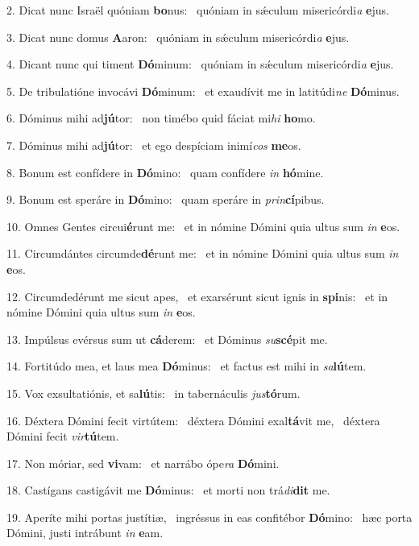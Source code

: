 2. Dicat nunc Israël quóniam \textbf{bo}nus: \ast\  quóniam in sǽculum misericórdi\textit{a} \textbf{e}jus.\

3. Dicat nunc domus \textbf{A}aron: \ast\  quóniam in sǽculum misericórdi\textit{a} \textbf{e}jus.\

4. Dicant nunc qui timent \textbf{Dó}minum: \ast\  quóniam in sǽculum misericórdi\textit{a} \textbf{e}jus.\

5. De tribulatióne invocávi \textbf{Dó}minum: \ast\  et exaudívit me in latitúdi\textit{ne} \textbf{Dó}minus.\

6. Dóminus mihi ad\textbf{jú}tor: \ast\  non timébo quid fáciat mi\textit{hi} \textbf{ho}mo.\

7. Dóminus mihi ad\textbf{jú}tor: \ast\  et ego despíciam inimí\textit{cos} \textbf{me}os.\

8. Bonum est confídere in \textbf{Dó}mino: \ast\  quam confídere \textit{in} \textbf{hó}mine.\

9. Bonum est speráre in \textbf{Dó}mino: \ast\  quam speráre in \textit{prin}\textbf{cí}pibus.\

10. Omnes Gentes circui\textbf{é}runt me: \ast\  et in nómine Dómini quia ultus sum \textit{in} \textbf{e}os.\

11. Circumdántes circumde\textbf{dé}runt me: \ast\  et in nómine Dómini quia ultus sum \textit{in} \textbf{e}os.\

12. Circumdedérunt me sicut apes, \dag\  et exarsérunt sicut ignis in \textbf{spi}nis: \ast\  et in nómine Dómini quia ultus sum \textit{in} \textbf{e}os.\

13. Impúlsus evérsus sum ut \textbf{cá}derem: \ast\  et Dóminus \textit{su}\textbf{scé}pit me.\

14. Fortitúdo mea, et laus mea \textbf{Dó}minus: \ast\  et factus est mihi in \textit{sa}\textbf{lú}tem.\

15. Vox exsultatiónis, et sa\textbf{lú}tis: \ast\  in tabernáculis \textit{jus}\textbf{tó}rum.\

16. Déxtera Dómini fecit virtútem: \dag\  déxtera Dómini exal\textbf{tá}vit me, \ast\  déxtera Dómini fecit \textit{vir}\textbf{tú}tem.\

17. Non móriar, sed \textbf{vi}vam: \ast\  et narrábo ópe\textit{ra} \textbf{Dó}mini.\

18. Castígans castigávit me \textbf{Dó}minus: \ast\  et morti non trá\textit{di}\textbf{dit} me.\

19. Aperíte mihi portas justítiæ, \dag\  ingréssus in eas confitébor \textbf{Dó}mino: \ast\  hæc porta Dómini, justi intrábunt \textit{in} \textbf{e}am.\

